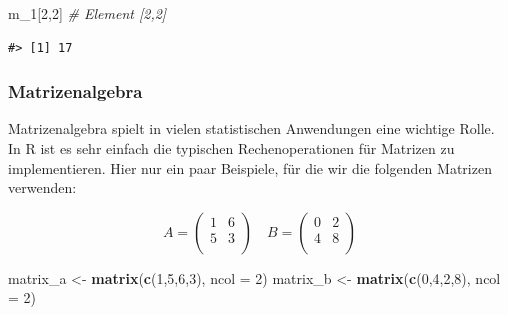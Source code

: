\documentclass[]{book}
\newenvironment{Shaded}{\begin{snugshade}}{\end{snugshade}}
\newcommand{\KeywordTok}[1]{\textcolor[rgb]{0.13,0.29,0.53}{\textbf{#1}}}
\newcommand{\DataTypeTok}[1]{\textcolor[rgb]{0.13,0.29,0.53}{#1}}
\newcommand{\DecValTok}[1]{\textcolor[rgb]{0.00,0.00,0.81}{#1}}
\newcommand{\StringTok}[1]{\textcolor[rgb]{0.31,0.60,0.02}{#1}}
\newcommand{\CommentTok}[1]{\textcolor[rgb]{0.56,0.35,0.01}{\textit{#1}}}
\newcommand{\NormalTok}[1]{#1}
\begin{document}
\begin{Shaded}
\begin{Highlighting}[]
\NormalTok{m_}\DecValTok{1}\NormalTok{[}\DecValTok{2}\NormalTok{,}\DecValTok{2}\NormalTok{] }\CommentTok{# Element [2,2]}
\end{Highlighting}
\end{Shaded}

\begin{verbatim}
#> [1] 17
\end{verbatim}

\subsubsection{Matrizenalgebra}\label{matrizenalgebra}

Matrizenalgebra spielt in vielen statistischen Anwendungen eine wichtige
Rolle. In R ist es sehr einfach die typischen Rechenoperationen für
Matrizen zu implementieren. Hier nur ein paar Beispiele, für die wir die
folgenden Matrizen verwenden:

\[A = \left( 
\begin{array}{rrr}                                
1 & 6 \\                                               
5 & 3 \\                                               
\end{array}
\right) \quad B = \left( 
\begin{array}{rrr}                                
0 & 2 \\                                               
4 & 8 \\                                               
\end{array}\right)\]

\begin{Shaded}
\begin{Highlighting}[]
\NormalTok{matrix_a <-}\StringTok{ }\KeywordTok{matrix}\NormalTok{(}\KeywordTok{c}\NormalTok{(}\DecValTok{1}\NormalTok{,}\DecValTok{5}\NormalTok{,}\DecValTok{6}\NormalTok{,}\DecValTok{3}\NormalTok{), }\DataTypeTok{ncol =} \DecValTok{2}\NormalTok{)}
\NormalTok{matrix_b <-}\StringTok{ }\KeywordTok{matrix}\NormalTok{(}\KeywordTok{c}\NormalTok{(}\DecValTok{0}\NormalTok{,}\DecValTok{4}\NormalTok{,}\DecValTok{2}\NormalTok{,}\DecValTok{8}\NormalTok{), }\DataTypeTok{ncol =} \DecValTok{2}\NormalTok{)}
\end{Highlighting}
\end{Shaded}
\end{document}
